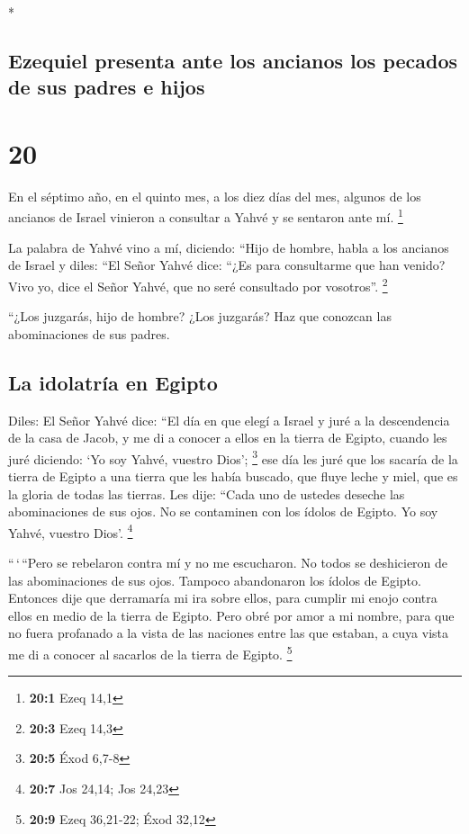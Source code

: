 \begin{paracol}{2}
\begin{otherlanguage}{english}
\end{otherlanguage}

\switchcolumn[0]*

\hypertarget{ezequiel-presenta-ante-los-ancianos-los-pecados-de-sus-padres-e-hijos}{%
\subsection{Ezequiel presenta ante los ancianos los pecados de sus
padres e
hijos}\label{ezequiel-presenta-ante-los-ancianos-los-pecados-de-sus-padres-e-hijos}}

\hypertarget{section-38}{%
\section{20}\label{section-38}}

 En el séptimo año, en el quinto mes, a los diez días del
mes, algunos de los ancianos de Israel vinieron a consultar a Yahvé y se
sentaron ante mí. \footnote{\textbf{20:1} Ezeq 14,1}

 La palabra de Yahvé vino a mí, diciendo: 
``Hijo de hombre, habla a los ancianos de Israel y diles: ``El Señor
Yahvé dice: ``¿Es para consultarme que han venido? Vivo yo, dice el
Señor Yahvé, que no seré consultado por vosotros''. \footnote{\textbf{20:3}
  Ezeq 14,3}

 ``¿Los juzgarás, hijo de hombre? ¿Los juzgarás? Haz que
conozcan las abominaciones de sus padres.

\hypertarget{la-idolatruxeda-en-egipto}{%
\subsection{La idolatría en Egipto}\label{la-idolatruxeda-en-egipto}}

 Diles: El Señor Yahvé dice: ``El día en que elegí a
Israel y juré a la descendencia de la casa de Jacob, y me di a conocer a
ellos en la tierra de Egipto, cuando les juré diciendo: `Yo soy Yahvé,
vuestro Dios'; \footnote{\textbf{20:5} Éxod 6,7-8}  ese
día les juré que los sacaría de la tierra de Egipto a una tierra que les
había buscado, que fluye leche y miel, que es la gloria de todas las
tierras.  Les dije: ``Cada uno de ustedes deseche las
abominaciones de sus ojos. No se contaminen con los ídolos de Egipto. Yo
soy Yahvé, vuestro Dios'. \footnote{\textbf{20:7} Jos 24,14; Jos 24,23}

 ``\,`\,``Pero se rebelaron contra mí y no me escucharon.
No todos se deshicieron de las abominaciones de sus ojos. Tampoco
abandonaron los ídolos de Egipto. Entonces dije que derramaría mi ira
sobre ellos, para cumplir mi enojo contra ellos en medio de la tierra de
Egipto.  Pero obré por amor a mi nombre, para que no fuera
profanado a la vista de las naciones entre las que estaban, a cuya vista
me di a conocer al sacarlos de la tierra de Egipto. \footnote{\textbf{20:9}
  Ezeq 36,21-22; Éxod 32,12}


\end{paracol}
